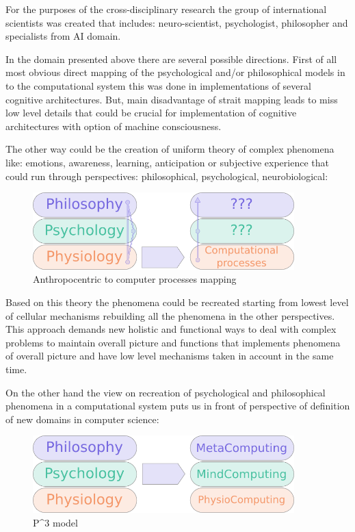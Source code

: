 For the purposes of the cross-disciplinary research the group of
international scientists was created that includes: neuro-scientist,
psychologist, philosopher and specialists from AI domain.

In the domain presented above there are several possible directions.
First of all most obvious direct mapping of the psychological and/or
philosophical models in to the computational system this was done in
implementations of several cognitive architectures. But, main
disadvantage of strait mapping leads to miss low level details that
could be crucial for implementation of cognitive architectures with
option of machine consciousness.

The other way could be the creation of uniform theory of complex
phenomena like: emotions, awareness, learning, anticipation or
subjective experience that could run through perspectives:
philosophical, psychological, neurobiological:

\begin{figure}[htbp]
\centering
\includegraphics[width=0.9\textwidth]{layers_binding.png}
\caption{Anthropocentric to computer processes mapping}
\end{figure}

Based on this theory the phenomena could be recreated starting from
lowest level of cellular mechanisms rebuilding all the phenomena in the
other perspectives. This approach demands new holistic and functional
ways to deal with complex problems to maintain overall picture and
functions that implements phenomena of overall picture and have low
level mechanisms taken in account in the same time.

On the other hand the view on recreation of psychological and
philosophical phenomena in a computational system puts us in front of
perspective of definition of new domains in computer science:

\begin{figure}[htbp]
\centering
\includegraphics[width=0.9\textwidth]{p3_model.png}
\caption{P\^{}3 model}
\end{figure}

